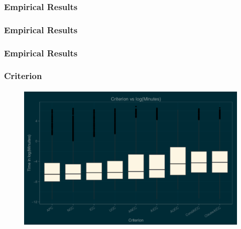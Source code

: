 \begin{frame}%
  \frametitle{Empirical Results}
  \framesubtitle{\mbox{}}
  \begin{center}


\end{center}
\end{frame}

\begin{frame}%
  \frametitle{Empirical Results}
  \framesubtitle{\mbox{}}
  \begin{center}


\end{center}
\end{frame}

\begin{frame}%
  \frametitle{Empirical Results}
  \framesubtitle{\mbox{}}
  \begin{center}


\end{center}
\end{frame}

% 
% 

\begin{frame}
\frametitle{Criterion}
\framesubtitle{\mbox{}}
\begin{figure}
\includegraphics[width=\textwidth]{CriterionBox}
\end{figure}

\vspace{-.10in}
\begin{figure}
\begin{centering}
\end{centering}
\end{figure}

\end{frame}

